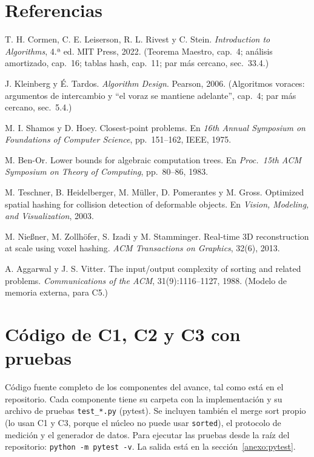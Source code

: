 \documentclass[11pt,letterpaper]{article}
\theoremstyle{plain}
\theoremstyle{definition}
\begin{document}
\section*{Referencias}
\begin{enumerate}[label={[\arabic*]},leftmargin=*]
\small
\item T. H. Cormen, C. E. Leiserson, R. L. Rivest y C. Stein. \emph{Introduction to Algorithms}, 4.ª ed.
MIT Press, 2022. (Teorema Maestro, cap.~4; análisis amortizado, cap.~16; tablas hash, cap.~11;
par más cercano, sec.~33.4.)
\item J. Kleinberg y É. Tardos. \emph{Algorithm Design}. Pearson, 2006. (Algoritmos voraces:
argumentos de intercambio y ``el voraz se mantiene adelante'', cap.~4; par más cercano, sec.~5.4.)
\item M. I. Shamos y D. Hoey. Closest-point problems. En \emph{16th Annual Symposium on Foundations of
Computer Science}, pp.~151--162, IEEE, 1975.
\item M. Ben-Or. Lower bounds for algebraic computation trees. En \emph{Proc.\ 15th ACM Symposium on
Theory of Computing}, pp.~80--86, 1983.
\item M. Teschner, B. Heidelberger, M. Müller, D. Pomerantes y M. Gross. Optimized spatial hashing
for collision detection of deformable objects. En \emph{Vision, Modeling, and Visualization}, 2003.
\item M. Nießner, M. Zollhöfer, S. Izadi y M. Stamminger. Real-time 3D reconstruction at scale using
voxel hashing. \emph{ACM Transactions on Graphics}, 32(6), 2013.
\item A. Aggarwal y J. S. Vitter. The input/output complexity of sorting and related problems.
\emph{Communications of the ACM}, 31(9):1116--1127, 1988. (Modelo de memoria externa, para C5.)
\end{enumerate}

\clearpage
\appendix
\section{Código de C1, C2 y C3 con pruebas}\label{anexo:codigo}

Código fuente completo de los componentes del avance, tal como está en el repositorio. Cada
componente tiene su carpeta con la implementación y su archivo de pruebas \texttt{test\_*.py}
(pytest). Se incluyen también el merge sort propio (lo usan C1 y C3, porque el núcleo no puede usar
\texttt{sorted}), el protocolo de medición y el generador de datos. Para ejecutar las pruebas desde la
raíz del repositorio: \texttt{python -m pytest -v}. La salida está en la sección~\ref{anexo:pytest}.
\end{document}
